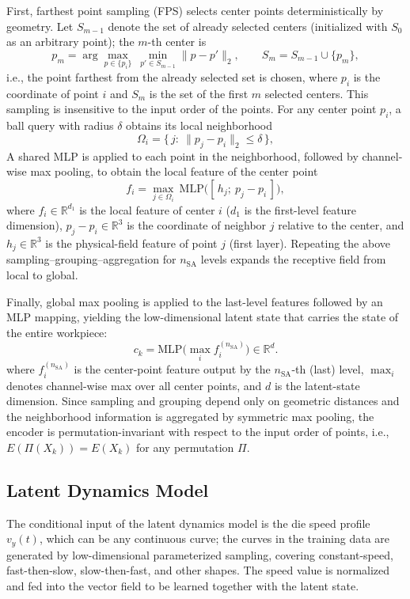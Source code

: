 First, farthest point sampling (FPS) selects center points deterministically by geometry. Let $S_{m-1}$ denote the set of already selected centers (initialized with $S_0$ as an arbitrary point); the $m$-th center is
\begin{equation}
p_{m}=\arg\max_{p\in\{p_i\}}\ \min_{p'\in S_{m-1}}\big\|p-p'\big\|_{2},\qquad S_{m}=S_{m-1}\cup\{p_{m}\},
\end{equation}
i.e., the point farthest from the already selected set is chosen, where $p_i$ is the coordinate of point $i$ and $S_m$ is the set of the first $m$ selected centers. This sampling is insensitive to the input order of the points. For any center point $p_i$, a ball query with radius $\delta$ obtains its local neighborhood
\begin{equation}
\Omega_i=\{\,j:\ \|p_j-p_i\|_{2}\le \delta\,\},
\end{equation}
A shared MLP is applied to each point in the neighborhood, followed by channel-wise max pooling, to obtain the local feature of the center point
\begin{equation}
f_i=\max_{j\in\Omega_i}\ \mathrm{MLP}\big([\,h_j;\ p_j-p_i\,]\big),
\end{equation}
where $f_i\in\mathbb{R}^{d_1}$ is the local feature of center $i$ ($d_1$ is the first-level feature dimension), $p_j-p_i\in\mathbb{R}^{3}$ is the coordinate of neighbor $j$ relative to the center, and $h_j\in\mathbb{R}^{3}$ is the physical-field feature of point $j$ (first layer). Repeating the above sampling--grouping--aggregation for $n_{\text{SA}}$ levels expands the receptive field from local to global.

Finally, global max pooling is applied to the last-level features followed by an MLP mapping, yielding the low-dimensional latent state that carries the state of the entire workpiece:
\begin{equation}
c_k=\mathrm{MLP}\Big(\max_{i} f_i^{(n_{\text{SA}})}\Big)\in\mathbb{R}^{d} .
\end{equation}
where $f_i^{(n_{\text{SA}})}$ is the center-point feature output by the $n_{\text{SA}}$-th (last) level, $\max_i$ denotes channel-wise max over all center points, and $d$ is the latent-state dimension. Since sampling and grouping depend only on geometric distances and the neighborhood information is aggregated by symmetric max pooling, the encoder is permutation-invariant with respect to the input order of points, i.e., $E(\Pi(X_k))=E(X_k)$ for any permutation $\Pi$.

\subsection{Latent Dynamics Model}
The conditional input of the latent dynamics model is the die speed profile $v_y(t)$, which can be any continuous curve; the curves in the training data are generated by low-dimensional parameterized sampling, covering constant-speed, fast-then-slow, slow-then-fast, and other shapes. The speed value is normalized and fed into the vector field to be learned together with the latent state.

